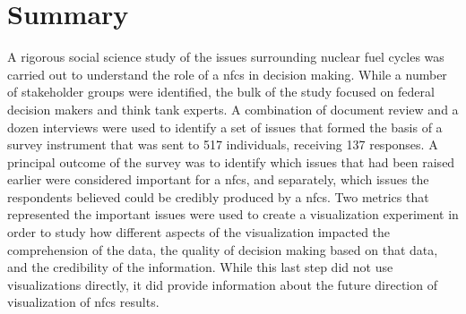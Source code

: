 \section{Summary}

A rigorous social science study of the issues surrounding nuclear fuel cycles
was carried out to understand the role of a \gls{nfcs} in decision making.
While a number of stakeholder groups were identified, the bulk of the study
focused on federal decision makers and think tank experts.  A combination of
document review and a dozen interviews were used to identify a set of issues
that formed the basis of a survey instrument that was sent to 517 individuals,
receiving 137 responses.  A principal outcome of the survey was to identify
which issues that had been raised earlier were considered important for a
\gls{nfcs}, and separately, which issues the respondents believed could be
credibly produced by a \gls{nfcs}.  Two metrics that represented the important
issues were used to create a visualization experiment in order to study how
different aspects of the visualization impacted the comprehension of the data,
the quality of decision making based on that data, and the credibility of the
information.  While this last step did not use \Cyclus visualizations
directly, it did provide information about the future direction of
visualization of \gls{nfcs} results.
